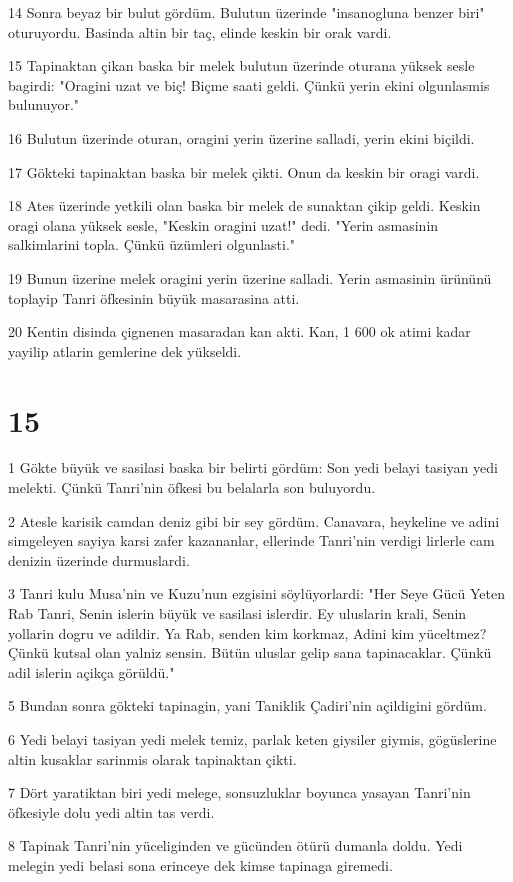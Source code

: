 \par 14 Sonra beyaz bir bulut gördüm. Bulutun üzerinde "insanogluna benzer biri" oturuyordu. Basinda altin bir taç, elinde keskin bir orak vardi.
\par 15 Tapinaktan çikan baska bir melek bulutun üzerinde oturana yüksek sesle bagirdi: "Oragini uzat ve biç! Biçme saati geldi. Çünkü yerin ekini olgunlasmis bulunuyor."
\par 16 Bulutun üzerinde oturan, oragini yerin üzerine salladi, yerin ekini biçildi.
\par 17 Gökteki tapinaktan baska bir melek çikti. Onun da keskin bir oragi vardi.
\par 18 Ates üzerinde yetkili olan baska bir melek de sunaktan çikip geldi. Keskin oragi olana yüksek sesle, "Keskin oragini uzat!" dedi. "Yerin asmasinin salkimlarini topla. Çünkü üzümleri olgunlasti."
\par 19 Bunun üzerine melek oragini yerin üzerine salladi. Yerin asmasinin ürününü toplayip Tanri öfkesinin büyük masarasina atti.
\par 20 Kentin disinda çignenen masaradan kan akti. Kan, 1 600 ok atimi kadar yayilip atlarin gemlerine dek yükseldi.

\chapter{15}

\par 1 Gökte büyük ve sasilasi baska bir belirti gördüm: Son yedi belayi tasiyan yedi melekti. Çünkü Tanri'nin öfkesi bu belalarla son buluyordu.
\par 2 Atesle karisik camdan deniz gibi bir sey gördüm. Canavara, heykeline ve adini simgeleyen sayiya karsi zafer kazananlar, ellerinde Tanri'nin verdigi lirlerle cam denizin üzerinde durmuslardi.
\par 3 Tanri kulu Musa'nin ve Kuzu'nun ezgisini söylüyorlardi: "Her Seye Gücü Yeten Rab Tanri, Senin islerin büyük ve sasilasi islerdir. Ey uluslarin krali, Senin yollarin dogru ve adildir. Ya Rab, senden kim korkmaz, Adini kim yüceltmez? Çünkü kutsal olan yalniz sensin. Bütün uluslar gelip sana tapinacaklar. Çünkü adil islerin açikça görüldü."
\par 5 Bundan sonra gökteki tapinagin, yani Taniklik Çadiri'nin açildigini gördüm.
\par 6 Yedi belayi tasiyan yedi melek temiz, parlak keten giysiler giymis, gögüslerine altin kusaklar sarinmis olarak tapinaktan çikti.
\par 7 Dört yaratiktan biri yedi melege, sonsuzluklar boyunca yasayan Tanri'nin öfkesiyle dolu yedi altin tas verdi.
\par 8 Tapinak Tanri'nin yüceliginden ve gücünden ötürü dumanla doldu. Yedi melegin yedi belasi sona erinceye dek kimse tapinaga giremedi.

